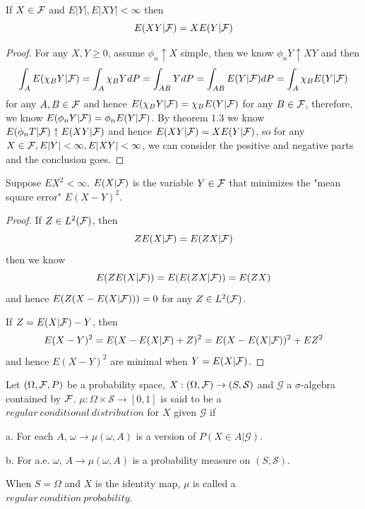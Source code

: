 \begin{theorem}
    If $X\in\mathcal{F}$ and $E|Y|, E|XY| < \infty$ then
    \[E(XY|\mathcal{F}) = XE(Y|\mathcal{F})\]
\end{theorem}
\begin{proof}\par
    For any $X,Y\geq 0$, assume $\phi_n \uparrow X$ simple, then we know $\phi_nY \uparrow XY$ and then
    \[\int_A E(\chi_BY|\mathcal{F}) = \int_A \chi_BY dP = \int_{AB} YdP = \int_{AB} E(Y|\mathcal{F})dP = \int_A \chi_BE(Y|\mathcal{F})\]
    for any $A,B\in\mathcal{F}$ and hence $E(\chi_BY|\mathcal{F}) = \chi_BE(Y|\mathcal{F})$ for any $B\in\mathcal{F}$, therefore, we know $E(\phi_nY|\mathcal{F}) = \phi_nE(Y|\mathcal{F})$. By theorem 1.3 we know $E(\phi_nT|\mathcal{F})\uparrow E(XY|\mathcal{F})$ and hence $E(XY|\mathcal{F}) = XE(Y|\mathcal{F})$, so for any $X\in\mathcal{F}, E|Y|<\infty, E|XY|<\infty$, we can consider the positive and negative parts and the conclusion goes.
\end{proof}

\begin{theorem}
    Suppose $EX^2 < \infty$. $E(X|\mathcal{F})$ is the variable $Y\in\mathcal{F}$ that minimizes the "mean square error" $E(X-Y)^2$.
\end{theorem}
\begin{proof}\par
    If $Z\in L^2(\mathcal{F})$, then
    \[ZE(X|\mathcal{F}) = E(ZX|\mathcal{F})\]
    then we know
    \[E(ZE(X|\mathcal{F})) = E(E(ZX|\mathcal{F})) = E(ZX)\]
    and hence $E(Z(X-E(X|\mathcal{F}))) = 0$ for any $Z\in L^2(\mathcal{F})$.\par
    If $Z = E(X|\mathcal{F})-Y$, then
    \[E(X-Y)^2 = E(X-E(X|\mathcal{F})+Z)^2 = E(X-E(X|\mathcal{F}))^2 + EZ^2\]
    and hence $E(X-Y)^2$ are minimal when $Y = E(X|\mathcal{F})$.\par
\end{proof}

\begin{definition}
Let $(\Omega, \mathcal{F}, P)$ be a probability space, $X:(\Omega,\mathcal{F})\to (S,\mathcal{S})$ and $\mathcal{G}$ a $\sigma$-algebra contained by $\mathcal{F}$. $\mu: \Omega\times \mathcal{S} \to [0,1]$ is said to be a $regular\ conditional\ distribution$ for $X$ given $\mathcal{G}$ if\par
a. For each $A$, $\omega \to \mu(\omega, A)$ is a version of $P(X\in A|\mathcal{G})$.\par
b. For a.e. $\omega$, $A\to \mu(\omega, A)$ is a probability measure on $(S,\mathcal{S})$.\par
When $S=\Omega$ and $X$ is the identity map, $\mu$ is called a $regular\ condition\ probability$.
\end{definition}

